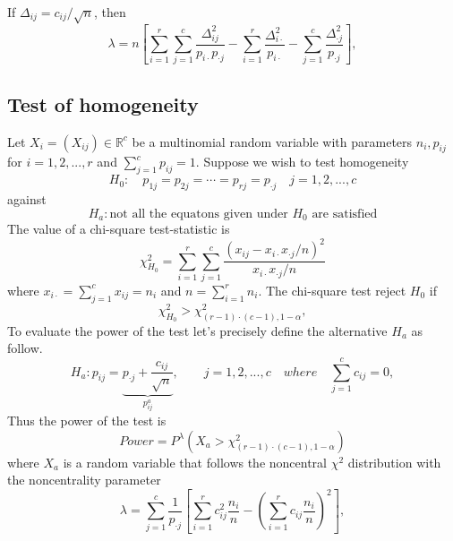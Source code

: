 \documentclass{article}
\begin{document}
If $\Delta_{ij} = c_{ij}/\sqrt{n}$, then 
\begin{equation}\label{independence_lambda}
    \lambda = n\left[\sum_{i=1}^{r}\sum_{j=1}^c \frac{\Delta_{ij}^2}{p_{i\cdot}p_{\cdot j}} - \sum_{i=1}^{r}\frac{\Delta_{i \cdot}^2}{p_{i \cdot}} - \sum_{j=1}^{c}\frac{\Delta_{\cdot j}^2}{p_{\cdot j}}\right],
\end{equation}



\subsection{Test of homogeneity}
Let $X_i=(X_{ij}) \in \mathbb{R}^{c}$ be a multinomial random variable with
parameters $n_{i},p_{ij}$ for $i=1,2,...,r$ and $\sum_{j=1}^cp_{ij}=1$. 
Suppose we wish to test homogeneity
\begin{equation}
    H_0: \quad p_{1j}=p_{2j}=\cdots = p_{rj} = p_{\cdot j}\quad j=1,2,...,c
\end{equation}
against
\begin{equation}
    H_a: \mbox{not all the equatons given under $H_0$ are satisfied}
\end{equation}
The value of a chi-square test-statistic is
\begin{equation}
    \chi^2_{H_0} = \sum_{i=1}^r\sum_{j=1}^c \frac{\left(x_{ij} - x_{i \cdot}x_{\cdot j}/n\right)^2}{x_{i \cdot}x_{\cdot j}/n}
\end{equation}
where $x_{i \cdot} = \sum_{j=1}^c x_{ij} = n_{i}$ and $n = \sum_{i=1}^r n_{i}$.
The chi-square test reject $H_0$ if
\begin{equation}
    \chi^2_{H_0} > \chi^2_{(r-1)\cdot(c-1),1-\alpha},
\end{equation}
To evaluate the power of the test let's precisely define the alternative $H_a$ as follow.
\begin{equation}
    H_a: p_{ij} = \underbrace{p_{\cdot j} + \frac{c_{ij}}{\sqrt{n}}}_{p^a_{ij}} , \qquad j=1,2,...,c \quad where \quad \sum_{j=1}^{c}c_{ij}=0, 
\end{equation}
Thus the power of the test is
\begin{equation}
    Power = P^{\lambda}\left(X_a > \chi^2_{(r-1)\cdot(c-1),1-\alpha}\right)
\end{equation}
where $X_a$ is a random variable that follows the noncentral $\chi^2$ distribution with the noncentrality parameter
\begin{equation}
    \lambda = \sum_{j=1}^{c}\frac{1}{p_{\cdot j}}\left[ \sum_{i=1}^{r} c_{ij}^2 \frac{n_i}{n} -  \left(\sum_{i=1}^{r} c_{ij} \frac{n_i}{n}\right)^2  \right],
\end{equation}
\end{document}
